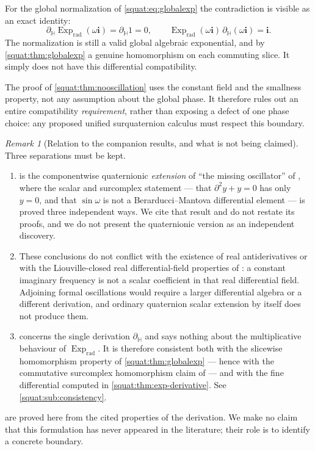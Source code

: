 \documentclass[11pt,letterpaper]{article}
\numberwithin{equation}{section}
\theoremstyle{definition}
\theoremstyle{remark}
\newtheorem{remark}[remark]{Remark}
\newcommand{\ii}{\mathbf i}
\newcommand{\Exp}{\operatorname{Exp}}
\newcommand{\Expr}{\Exp_{\mathrm{rad}}}
\newcommand{\dH}{\partial_{\mathbb H}}
\begin{document}
For the global normalization of \cref{squat:eq:globalexp} the contradiction is visible as
an exact identity:
\begin{equation}\label{squat:eq:chainwitness}
 \dH\Expr(\omega\ii)=\dH1=0,
 \qquad \Expr(\omega\ii)\,\dH(\omega\ii)=\ii .
\end{equation}
The normalization is still a valid global algebraic exponential, and by
\cref{squat:thm:globalexp} a genuine homomorphism on each commuting slice. It simply does
not have this differential compatibility.

The proof of \cref{squat:thm:nooscillation} uses the constant field and the smallness
property, not any assumption about the global phase. It therefore rules out an entire
compatibility \emph{requirement}, rather than exposing a defect of one phase choice: any
proposed unified surquaternion calculus must respect this boundary.

\begin{remark}[Relation to the companion results, and what is not being claimed]
\label{squat:rem:oscillation-relations}
Three separations must be kept.
\begin{enumerate}[label=\textup{(\arabic*)},leftmargin=2.4em]
\item {} is the componentwise quaternionic
\emph{extension} of ``the missing oscillator'' of \cite{RepoDiff}, where the scalar and
surcomplex statement --- that $\partial^2y+y=0$ has only $y=0$, and that $\sin\omega$ is
not a Berarducci--Mantova differential element --- is proved three independent ways. We
cite that result and do not restate its proofs, and we do not present the quaternionic
version as an independent discovery.
\item These conclusions do not conflict with the existence of real antiderivatives or with
the Liouville-closed real differential-field properties of \cite{BM}: a constant imaginary
frequency is not a scalar coefficient in that real differential field. Adjoining formal
oscillations would require a larger differential algebra or a different derivation, and
ordinary quaternion scalar extension by itself does not produce them.
\item {} concerns the single derivation $\dH$ and says nothing about
the multiplicative behaviour of $\Expr$. It is therefore consistent both with the
slicewise homomorphism property of \cref{squat:thm:globalexp} --- hence with the
commutative surcomplex homomorphism claim of \cite{RepoPhys} --- and with the fine
differential computed in \cref{squat:thm:exp-derivative}. See
\cref{squat:sub:consistency}.
\end{enumerate}
 are proved here from the cited properties
of the derivation. We make no claim that this formulation has never appeared in the
literature; their role is to identify a concrete boundary.
\end{remark}
\end{document}
